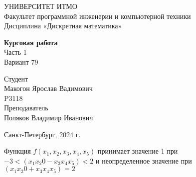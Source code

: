 \documentclass{article}
\begin{document}
\begin{center}
    УНИВЕРСИТЕТ ИТМО \\
    Факультет программной инженерии и компьютерной техники \\
    Дисциплина «Дискретная математика»
    
    \vspace{5cm}

    \large
    \textbf{Курсовая работа} \\
    Часть 1 \\
    Вариант 79
\end{center}

\vspace{2cm}

\hfill\begin{minipage}{0.35\linewidth}
Студент \\
Макогон Ярослав Вадимович \\
P3118 \\

Преподаватель \\
Поляков Владимир Иванович
\end{minipage}

\vfill

\begin{center}
    Санкт-Петербург, 2024 г.
\end{center}

\thispagestyle{empty}
\newpage

Функция $f(x_1, x_2, x_3, x_4, x_5)$ принимает значение 1 при $-3 < (x_1 x_2 0 - x_3 x_4 x_5) < 2$ и неопределенное значение при $(x_1 x_2 0 + x_3 x_4 x_5) = 2$
\end{document}
